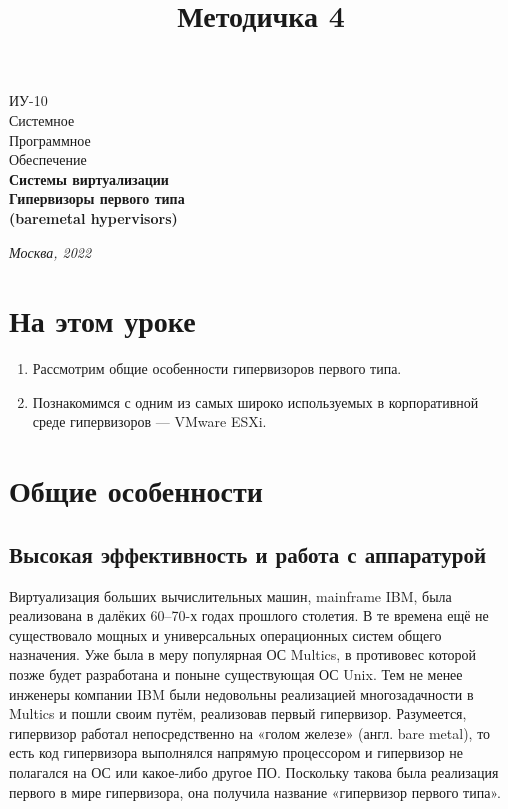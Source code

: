 \documentclass[14pt, a4paper]{article}
\title{Методичка 4}
\begin{document}
\begin{titlepage}
    \topmargin=216pt
    \newpage
    \hangindent=0.7cm
    \huge ИУ-10\\
    Системное\\
    Программное\\
    Обеспечение\\
    \textbf{Системы виртуализации\\ Гипервизоры первого типа\\
    (baremetal hypervisors)}

    \vspace{10cm}

    \begin{center}
        \small\textit{Москва, 2022}
    \end{center}
\end{titlepage}
\section*{На этом уроке}
\begin{enumerate}
    \item Рассмотрим общие особенности гипервизоров первого типа.
    \item Познакомимся с одним из самых широко используемых в корпоративной среде гипервизоров
    — VMware ESXi.
\end{enumerate}
\tableofcontents
\newpage

\section*{Общие особенности}

\subsection*{Высокая эффективность и работа с аппаратурой}

Виртуализация больших вычислительных машин, mainframe IBM, была реализована в далёких
60–70-х годах прошлого столетия. В те времена ещё не существовало мощных и универсальных
операционных систем общего назначения. Уже была в меру популярная ОС Multics, в противовес
которой позже будет разработана и поныне существующая ОС Unix. Тем не менее инженеры
компании IBM были недовольны реализацией многозадачности в Multics и пошли своим путём,
реализовав первый гипервизор. Разумеется, гипервизор работал непосредственно на «голом железе»
(англ. bare metal), то есть код гипервизора выполнялся напрямую процессором и гипервизор не
полагался на ОС или какое-либо другое ПО. Поскольку такова была реализация первого в мире
гипервизора, она получила название «гипервизор первого типа».
\end{document}
